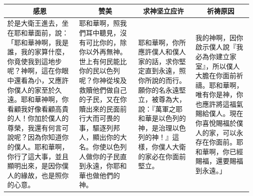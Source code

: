 \begin{table}[H]
\hspace{-12mm}
\centering
\begin{tabular}{p{5.5cm}|p{4.25cm}|p{3.5cm}|p{3.5cm}}\hline\hline
\multicolumn{1}{c|}{感恩}&\multicolumn{1}{c|}{赞美}&\multicolumn{1}{c}{求神坚立应许}&\multicolumn{1}{c}{祈祷原因}\\\hline
於是大衛王進去，坐在耶和華面前，說：「耶和華神啊，我是誰，我的家算什麼，你竟使我到這地步呢？神啊，這在你眼中還看為小，又應許你僕人的家至於久遠。耶和華神啊，你看顧我好像看顧高貴的人！你加於僕人的尊榮，我還有何言可說呢？因為你知道你的僕人。耶和華啊，你行了這大事，並且顯明出來，是因你僕人的緣故，也是照你的心意。 
&耶和華啊，照我們耳中聽見，沒有可比你的，除你以外再無神。世上有何民能比你的民以色列呢？你神從埃及救贖他們做自己的子民，又在你贖出來的民面前行大而可畏的事，驅逐列邦人，顯出你的大名。你使以色列人做你的子民直到永遠，你耶和華也做他們的神。
&耶和華啊，你所應許僕人和僕人家的話，求你堅定直到永遠，照你所說的而行。願你的名永遠堅立，被尊為大，說：『萬軍之耶和華是以色列的神，是治理以色列的神！』這樣，你僕人大衛的家必在你面前堅立。 
&我的神啊，因你啟示僕人說『我必為你建立家室』，所以僕人大膽在你面前祈禱。耶和華啊，唯有你是神，你也應許將這福氣賜給僕人。現在你喜悅賜福於僕人的家，可以永存在你面前。耶和華啊，你已經賜福，還要賜福到永遠。」\\\hline
\end{tabular}
\end{table}	 

